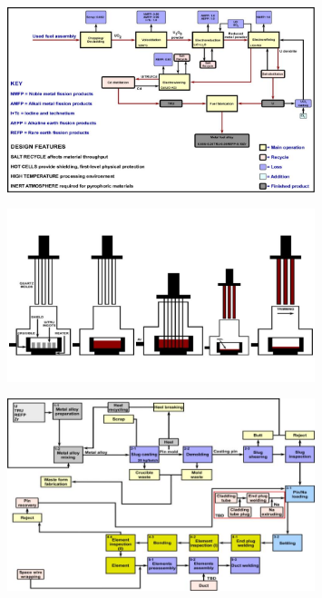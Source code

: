 \documentclass[aspectratio=1610,pdftex,dvipsnames,compress,xcolor={dvipsnames}]{beamer}
\begin{document}
\addtocounter{framenumber}{-1}
\begin{frame}{}
    \begin{figure}
        \centering
        \includegraphics[width=0.80\textwidth]{pyroprocessing.flowsheet.jpg}
    \end{figure}
\end{frame}


\begin{frame}{}
    \begin{figure}
        \centering
        \includegraphics[width=0.80\textwidth]{fuel.fabrication.jpg}
    \end{figure}
\end{frame}


\begin{frame}{}
    \begin{figure}
        \centering
        \includegraphics[width=0.80\textwidth]{fuel.fabrication.process.steps.jpg}
    \end{figure}
\end{frame}
\end{document}
